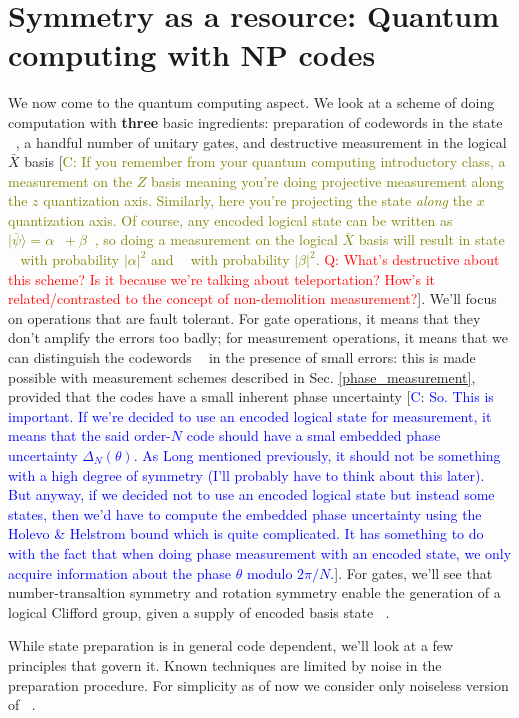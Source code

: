 \documentclass{article}
\DeclareMathOperator{\lgcplus}{|\bar{+}\rangle}
\DeclareMathOperator{\lgcminus}{|\bar{-}\rangle}
\DeclareMathOperator{\lgcpm}{|\bar{\pm}\rangle}
\begin{document}
\section{Symmetry as a resource: Quantum computing with NP codes}
We now come to the quantum computing aspect. We look at a scheme of doing computation with \textbf{three} basic ingredients: preparation of codewords in the state $\lgcplus$, a handful number of unitary gates, and destructive measurement in the logical $\bar{X}$ basis [\textcolor{olive}{C: If you remember from your quantum computing introductory class, a measurement on the $Z$ basis meaning you're doing projective measurement along the $z$ quantization axis. Similarly, here you're projecting the state \textit{along} the $x$ quantization axis. Of course, any encoded logical state can be written as $|\bar{\psi}\rangle=\alpha\lgcplus+\beta\lgcminus$, so doing a measurement on the logical $\bar{X}$ basis will result in state $\lgcplus$ with probability $|\alpha|^2$ and $\lgcminus$ with probability $|\beta|^2$.} \textcolor{red}{Q: What's destructive about this scheme? Is it because we're talking about teleportation? How's it related/contrasted to the concept of non-demolition measurement?}]. We'll focus on operations that are fault tolerant. For gate operations, it means that they don't amplify the errors too badly; for measurement operations, it means that we can distinguish the codewords $\lgcpm$ in the presence of small errors: this is made possible with measurement schemes described in Sec. \ref{phase_measurement}, provided that the codes have a small inherent phase uncertainty [\textcolor{blue}{C: So. This is important. If we're decided to use an encoded logical state for measurement, it means that the said order-$N$ code should have a smal embedded phase uncertainty $\Delta_N(\theta)$. As Long mentioned previously, it should not be something with a high degree of symmetry (I'll probably have to think about this later). But anyway, if we decided not to use an encoded logical state but instead some states, then we'd have to compute the embedded phase uncertainty using the Holevo \& Helstrom bound which is quite complicated. It has something to do with the fact that when doing phase measurement with an encoded state, we only acquire information about the phase $\theta$ modulo $2\pi/N$.}]. For gates, we'll see that number-transaltion symmetry and rotation symmetry enable the generation of a logical Clifford group, given a supply of encoded basis state $\lgcplus$. 

While state preparation is in general code dependent, we'll look at a few principles that govern it. Known techniques are limited by noise in the preparation procedure. For simplicity as of now we consider only noiseless version of $\lgcplus$. 
\end{document}

